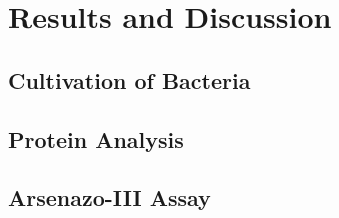 \chapter{Results and Discussion}

\section{Cultivation of Bacteria\authorB}

\section{Protein Analysis\authorA}

\section{Arsenazo-III Assay\authorA}

